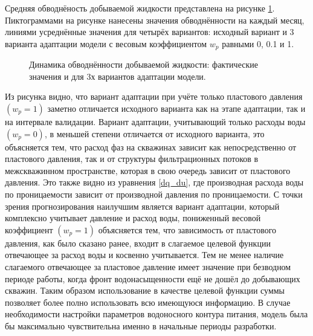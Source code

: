 \documentclass{article}
\begin{document}
Средняя обводнёность добываемой жидкости представлена на рисунке \ref{fig:wtс}. Пиктограммами на рисунке нанесены значения обводнённости на каждый месяц, линиями усреднённые значения для четырёх вариантов: исходный вариант и 3 варианта адаптации модели с весовым коэффициентом $w_p$ равными 0, 0.1 и 1. 
\begin{figure}
	\caption{Динамика обводнённости добываемой жидкости: фактические значения и для 3х вариантов адаптации модели.}
	\label{fig:wtс}
\end{figure}
Из рисунка видно, что вариант адаптации при учёте только пластового давления $(w_p=1)$ заметно отличается исходного варианта как на этапе адаптации, так и на интервале валидации. Вариант адаптации, учитывающий только расходы воды $(w_p=0)$, в меньшей степени отличается от исходного варианта, это объясняется тем, что расход фаз на скважинах зависит как 
непосредственно от пластового давления, так и от структуры фильтрационных потоков в межскважинном пространстве, которая в свою очередь зависит от пластового давления. Это также видно из уравнения \ref{dq_du}, где производная расхода воды по проницаемости зависит от производной давления по проницаемости. С точки зрения прогнозирования наилучшим является вариант адаптации, который комплексно учитывает давление и расход воды, пониженный весовой коэффициент $(w_p=1)$ объясняется тем, что зависимость от пластового давления, как было сказано ранее, входит в слагаемое целевой функции отвечающее за расход воды и косвенно учитывается. Тем не менее наличие слагаемого отвечающее за пластовое давление имеет значение при безводном периоде работы, когда фронт водонасыщенности ещё не дошёл до добывающих скважин. Таким образом использование в качестве целевой функции суммы позволяет более полно использовать всю имеющуюся информацию. В случае необходимости настройки параметров водоносного контура питания, модель была бы максимально чувствительна именно в начальные периоды разработки.
\end{document}
